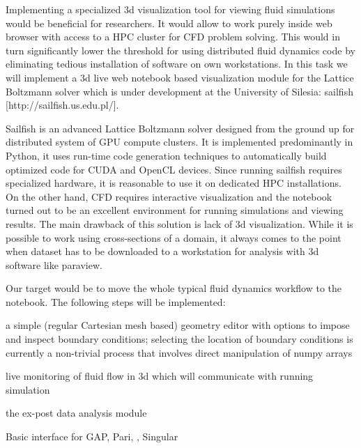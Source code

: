 \begin{workpackage}
\begin{tasklist}
\begin{task}[title=Visualization system for fluid dynamics data in  web-notebook
, id=cfd-vis]
Implementing a specialized 3d visualization tool for viewing fluid
simulations would be beneficial for researchers. It would allow to
work purely inside web browser with access to a HPC cluster for CFD
problem solving. This would in turn significantly lower the threshold
for using distributed fluid dynamics code by eliminating tedious
installation of software on own workstations. In this task we will
implement a 3d live web notebook based visualization module for the
Lattice Boltzmann solver which is under development at the University
of Silesia: sailfish [http://sailfish.us.edu.pl/].

Sailfish is an advanced Lattice Boltzmann solver designed from the
ground up for distributed system of GPU compute clusters. It is
implemented predominantly in Python, it uses run-time code generation
techniques to automatically build optimized code for CUDA and OpenCL
devices. Since running sailfish requires specialized hardware, it is
reasonable to use it on dedicated HPC installations. On the other
hand, CFD requires interactive visualization and the \Jupyter notebook
turned out to be an excellent environment for running simulations and
viewing results. The main drawback of this solution is lack of 3d
visualization. While it is possible to work using cross-sections of a
domain, it always comes to the point when dataset has to be downloaded
to a workstation for analysis with 3d software like paraview.

Our target would be to move the whole typical fluid dynamics workflow
to the notebook. The following steps will be implemented:



\begin{compactitem}
\item a simple (regular Cartesian mesh based) geometry editor with
  options to impose and inspect boundary conditions; selecting the
  location of boundary conditions is currently a non-trivial process
  that involves direct manipulation of numpy arrays
\item live monitoring of fluid flow in 3d which will communicate with
  running simulation
\item the ex-post data analysis module
\end{compactitem}
                 

\end{task}


\end{tasklist}

\begin{wpdelivs}
  \begin{wpdeliv}[due=12,id=ipython-kernels-basic,dissem=PU,nature=O]
      {Basic \Jupyter interface for GAP, Pari, \Sage, Singular}
  \end{wpdeliv}
  

\end{wpdelivs}
\end{workpackage}
